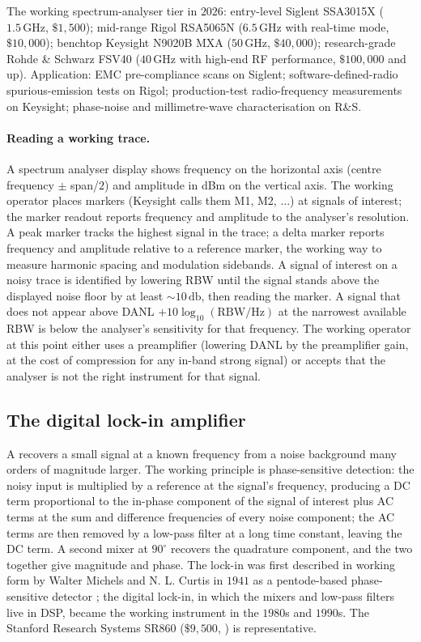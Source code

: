 The working spectrum-analyser tier in $2026$: entry-level Siglent
SSA3015X ($1.5 \,\si{\giga\hertz}$, $\$1{,}500$);
mid-range Rigol RSA5065N ($6.5 \,\si{\giga\hertz}$ with real-time
mode, $\$10{,}000$); benchtop Keysight N9020B MXA ($50
\,\si{\giga\hertz}$, $\$40{,}000$); research-grade Rohde \&
Schwarz FSV40 ($40 \,\si{\giga\hertz}$ with high-end RF performance,
$\$100{,}000$ and up). Application: EMC pre-compliance scans
on Siglent; software-defined-radio spurious-emission tests on Rigol;
production-test radio-frequency measurements on Keysight;
phase-noise and millimetre-wave characterisation on R\&S.

\paragraph{Reading a working trace.} A spectrum analyser display
shows frequency on the horizontal axis (centre frequency
$\pm$ span/$2$) and amplitude in dBm on the vertical axis. The
working operator places markers (Keysight calls them M1, M2,
$\ldots$) at signals of interest; the marker readout reports
frequency and amplitude to the analyser's resolution. A peak
marker tracks the highest signal in the trace; a delta marker
reports frequency and amplitude relative to a reference marker, the
working way to measure harmonic spacing and modulation sidebands.
A signal of interest on a noisy trace is identified by lowering
RBW until the signal stands above the displayed noise floor by at
least $\sim 10 \,\si{\decibel}$, then reading the marker. A signal
that does not appear above DANL $+ 10 \log_{10}(\text{RBW}/\si
{\hertz})$ at the narrowest available RBW is below the analyser's
sensitivity for that frequency. The working operator at this point
either uses a preamplifier (lowering DANL by the preamplifier
gain, at the cost of compression for any in-band strong signal) or
accepts that the analyser is not the right instrument for that
signal.

\subsection{The digital lock-in amplifier}

A  recovers a small signal at a known
frequency from a noise background many orders of magnitude larger.
The working principle is phase-sensitive detection: the noisy input
is multiplied by a reference at the signal's frequency, producing a
DC term proportional to the in-phase component of the signal of
interest plus AC terms at the sum and difference frequencies of
every noise component; the AC terms are then removed by a low-pass
filter at a long time constant, leaving the DC term. A second
mixer at $90^{\circ}$ recovers the quadrature component, and the
two together give magnitude and phase. The lock-in was first
described in working form by Walter Michels and N. L. Curtis in
$1941$ as a pentode-based phase-sensitive detector
\cite{paper:ch05t3-michels-curtis-1941}; the digital lock-in,
in which the mixers and low-pass filters live in DSP, became the
working instrument in the $1980$s and $1990$s. The Stanford
Research Systems SR860 ($\$9{,}500$,
\cite{text:ch05t3-srs-sr860-datasheet}) is representative.

